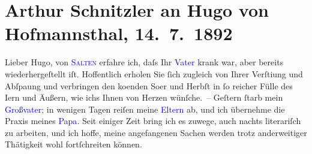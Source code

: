 

               \section[Arthur Schnitzler an Hugo von Hofmannsthal, 14. 7. 1892]{ Arthur Schnitzler an Hugo von Hofmannsthal, 14. 7. 1892}\nopagebreak{}\rehead{ }\normalsize\beginnumbering{} \toendnotes[C]{\smallbreak\pagebreak[2]} 
\toendnotes[C]{\smallbreak}\pstart{}{\pb}Lieber Hugo,\pend\pstart
           von \textcolor{blue}{\textsc{Salten}}{}\ledrightnote{\textcolor{blue}{Felix Salten}} erfahre
                    ich, daſs Ihr \textcolor{blue}{Vater}{} krank war, aber
                    bereits wiederhergeſtellt iſt. Hoffentlich erholen Sie ſich zugleich von Ihrer
                        Verſti{\geminationm}ung und Abſpa{\geminationn}ung und verbringen den ko{\geminationm}enden So{\geminationm}er und
                    Herbſt in ſo reicher Fülle des I{\geminationn}ern und Äußern,
                    wie ichs Ihnen von Herzen wünſche. –\pend
           \pstart
           Geſtern ſtarb mein \textcolor{blue}{Großvater}{}; {\pb}in wenigen Tagen reiſen meine \textcolor{blue}{Eltern}{} ab, und ich übernehme die Praxis meines
                        \textcolor{blue}{Papa}{}.\pend
           \pstart
           Seit einiger Zeit bring ich es zuwege, auch nachts literariſch zu arbeiten, und
                    ich hoffe, meine angefangenen Sachen werden trotz anderweitiger Thätigkeit wohl
                    fortſchreiten können.\pend
